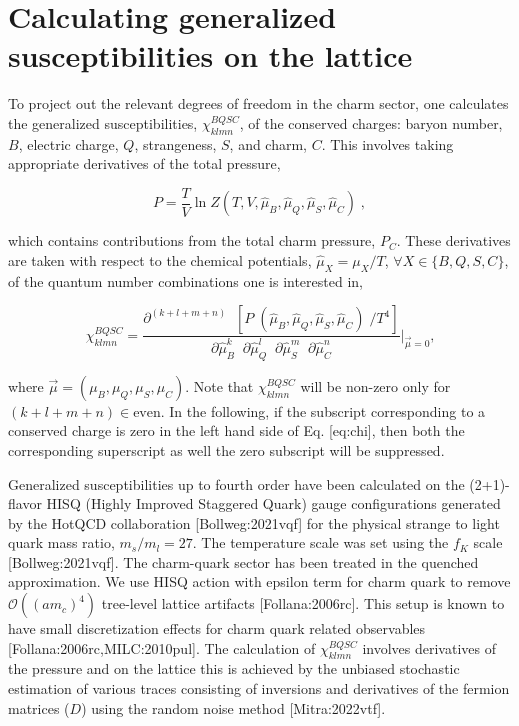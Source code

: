 \documentclass[11pt,a4paper]{article}
\begin{document}
\section{Calculating generalized susceptibilities on the lattice}

To project out the relevant degrees of freedom in the charm sector, one calculates the generalized susceptibilities, ${\chi^{BQSC}_{klmn}}$, of the conserved charges: baryon number, $B$, electric charge, $Q$, strangeness, $S$, and charm, $C$. This involves taking appropriate derivatives of the total pressure,

$$\begin{equation}
    P=\frac{T}{V}\ln Z(T,V,\hat{\mu}_B,\hat{\mu}_Q,\hat{\mu}_S,\hat{\mu}_C)
    \; ,

\end{equation}$$

which contains contributions from the total charm pressure, $P_C$. These derivatives are taken with respect to the chemical potentials, ${\hat{\mu}_X = \mu_X/T}$, ${\forall X \in \{B, Q, S, C\}}$, of the quantum number combinations one is interested in,

$$\begin{equation} 
	{\chi^{BQSC}_{klmn}=\dfrac{\partial^{(k+l+m+n)}\;\;[P\;(\hat{\mu}_B,\hat{\mu}_Q,\hat{\mu}_S,\hat{\mu}_C)\;/T^4]}{\partial\hat{\mu}^{k}_B\;\;\partial\hat{\mu}^{l}_Q\;\;\partial\hat{\mu}^{m}_S\;\;\partial\hat{\mu}^{n}_C}}\bigg|_{\overrightarrow{\mu}=0}\text{,}
	
\end{equation}$$

where $\vec{\mu}=(\mu_B, \mu_Q, \mu_S, \mu_C)$. Note that ${\chi^{BQSC}_{klmn}}$ will be non-zero only for ${(k+l+m+n) \in \text{even}}$. In the following, if the subscript corresponding to a conserved charge is zero in the left hand side of Eq. [eq:chi], then both the corresponding superscript as well the zero subscript will be suppressed.

Generalized susceptibilities up to fourth order have been calculated on the (2+1)-flavor HISQ (Highly Improved Staggered Quark) gauge configurations generated by the HotQCD collaboration [Bollweg:2021vqf] for the physical strange to light quark mass ratio, ${m_s/m_{l}}=27$. The temperature scale was set using the $f_K$ scale [Bollweg:2021vqf]. The charm-quark sector has been treated in the quenched approximation. We use HISQ action with epsilon term for charm quark to remove $\mathcal{O}((am_c)^4)$ tree-level lattice artifacts [Follana:2006rc]. This setup is known to have small discretization effects for charm quark related observables [Follana:2006rc,MILC:2010pul]. The calculation of $\chi^{BQSC}_{klmn}$ involves derivatives of the pressure and on the lattice this is achieved by the unbiased stochastic estimation of various traces  consisting of inversions and derivatives  of the fermion matrices ($D$)  using the random noise method [Mitra:2022vtf].
\end{document}
